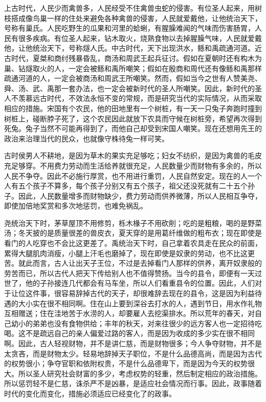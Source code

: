 \documentclass[12pt,UTF-8,openany,a4]{ctexbook}
\begin{document}
\begin{large}
    \yiwen 
    上古时代，人民少而禽兽多，人民经受不住禽兽虫蛇的侵害。有位圣人起来，用树枝搭成像鸟巢一样的住处来避免各种禽兽的侵害，人民就爱戴他，让他统治天下，号称有巢氏。人民吃野生的瓜果和河里的蛤蜊，有腥臊难闻的气味而伤害肠胃，人民有很多疾病。有位圣人起来，钻木取火，烧熟食物以去掉腥臊气味，人民就爱戴他，让他统治天下，号称燧人氏。中古时代，天下出现洪水，鲧和禹疏通河道。近古时代，夏桀和商纣残暴昏乱，商汤和周武王起兵征讨。假如在夏朝时还有构木为巢、钻燧取火的人，一定会被鲧和禹所嘲笑；假如在殷商和周代还有像鲧和禹那样疏通河道的人，一定会被商汤和周武王所嘲笑。然而，假如当今之世有人赞美尧、舜、汤、武、禹那一套办法，也一定会被新时代的圣人所嘲笑。因此，新时代的圣人不羡慕远古时代，不效法永恒不变的常规，而是研究当代的实际情况，从而采取相应的措施。宋国有个农民，他的田地里有一个树桩，有一天一只兔子奔跑时撞到树桩上，碰断脖子死了，这个农民因此就放下农具而守候在树桩旁，希望再次得到死兔。兔子当然不可能再得到了，而他自己却受到宋国人嘲笑。现在还想用先王的政治来治理当代的民众，也就像守株待兔一样可笑。
    
    古时侯男人不耕地，是因为草木的果实充足够吃；妇女不纺织，是因为禽兽的毛皮充足够穿。不用费力劳动而生活给养就很充足，人民数量少而财物有多余的，所以人民不争夺。因此不必施行厚赏，也不用进行重罚，人民自然安定。现在的人一个人有五个孩子不算多，每个孩子分别又有五个孩子，祖父还没死就有二十五个孙子。因此，人民数量增多而财物缺少，费力劳动而供养微薄，所以人民相互争夺，即使加倍地奖赏和多次地惩罚，也难免祸乱。
    
    尧统治天下时，茅草屋顶不用修剪，栎木椽子不用砍削；吃的是粗粮，喝的是野菜汤；冬天披的是质量很差的兽皮衣，夏天穿的是用葛纤维做的粗布衣；现在即使是看门的人吃穿也不会比这更差了。禹统治天下时，自己拿着农具走在民众的前面，累得大腿肌肉消瘦，小腿上汗毛也磨掉了，现在即使是奴隶的劳动，也不比这更苦。就此而言，古人让出天子王位，不过是去掉看门人那样的供养，离开奴隶般的劳苦而已，所以古代人把天下传给别人也不值得赞扬。当今的县令，即便有一天过世了，他的子孙接连几代都会有马车坐，所以人们看重县令的位置。因此，人们对于让位这件事，很容易辞掉古代的天子，却很难辞去现在的县令，这是因为利益待遇的大小实在很不相同啊。住在山上要到深谷去打水的人，遇到节日，用水作礼物互相赠送；住在洼地苦于水涝的人，却要雇人去挖渠排水。所以荒年的春天，对自己幼小的弟弟也没有食物供给；丰年的秋天，对来往很少的远方客人也一定招待吃喝。这不是疏远自己的亲人偏爱过路的客人，而是因为收成的多少实在很不相同啊。因此，古人轻视财物，并不是讲仁慈，而是财物很多；今人争夺财物，并不是太贪吝，而是财物太少。轻易地辞掉天子职位，不是什么品德高尚，而是因为古代的权势很小；争夺官职和依附权贵，不是什么品德卑下，而是因为今天的权势很大。所以圣人研究社会财富的多少，考虑权势的轻重，然后制定相应的政治措施。所以惩罚轻不是仁慈，诛杀严不是凶暴，是适应社会情况而行事。因此，政事随着时代的变化而变化，措施必须适应已经变化了的政事。
    

\end{large}
\end{document}

